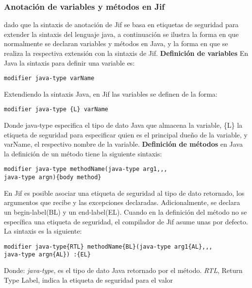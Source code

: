 \subsubsection{Anotación de variables y métodos en Jif}
\label{sssec:sintaxis}
dado que la sintaxis de anotación de Jif se basa en etiquetas de seguridad para
extender la sintaxis del lenguaje java, a continuación se ilustra la forma en
que normalmente se declaran variables y métodos en Java, y la forma en que se
realiza la respectiva extensión con la sintaxis de Jif.\newline
\textbf{Definición de variables}\newline
En Java la sintaxis para definir una variable es:
\begin{lstlisting}[basicstyle=\scriptsize]
	modifier java-type varName
\end{lstlisting}
Extendiendo la sintaxis Java, en Jif las variables se definen de la forma:
\begin{lstlisting}[basicstyle=\scriptsize]
	modifier java-type {L} varName
\end{lstlisting}
Donde java-type especifica el tipo de dato Java que almacena la variable, \{L\}
la etiqueta de seguridad  para especificar quien es el principal dueño de la
variable, y varName, el respectivo nombre de la variable.\newline
\textbf{Definición de métodos}\newline
en Java la definición de un método tiene la siguiente sintaxis:
\begin{lstlisting}[basicstyle=\scriptsize]
modifier java-type methodName(java-type arg1,,, 
java-type argn){body method}
\end{lstlisting}
En Jif  es posible asociar una etiqueta de seguridad al tipo de dato retornado,
los argumentos que recibe y las excepciones declaradas. 
Adicionalmente, se declara un begin-label(BL) y un end-label(EL).\newline
Cuando en la definición del método no se específica una etiqueta de seguridad,
el compilador de Jif asume unas por defecto. 
La sintaxis es la siguiente:
\begin{lstlisting}[basicstyle=\scriptsize]
modifier java-type{RTL} methodName{BL}(java-type arg1{AL},,,
java-type argn{AL}) :{EL}
\end{lstlisting}
Donde: \emph{java-type}, es el tipo de dato Java retornado por el
método.\newline 
\emph{RTL}, Return Type Label, indica la etiqueta de seguridad para el valor
